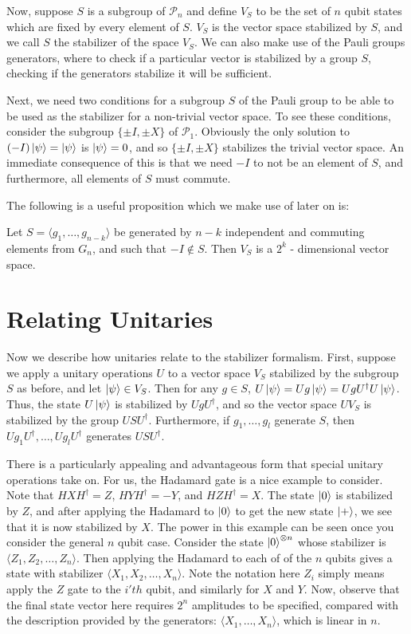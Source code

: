 \documentclass[12pt]{dalthesis}
\begin{document}
Now, suppose $S$ is a subgroup of $\mathcal{P}_n$ and define $V_S$ to be the set of $n$ qubit states which are fixed by every element of $S$. $V_S$ is the vector space stabilized by $S$, and we call $S$ the stabilizer of the space $V_S$. We can also make use of the Pauli groups generators, where to check if a particular vector is stabilized by a group $S$, checking if the generators stabilize it will be sufficient.

Next, we need two conditions for a subgroup $S$ of the Pauli group to be able to be used as the stabilizer for a non-trivial vector space. To see these conditions, consider the subgroup $\{\pm I, \pm X \}$ of $\mathcal{P}_1$. Obviously the only solution to $(-I)\ket{\psi} = \ket{\psi}$ is $\ket{\psi} = 0$, and so $\{\pm I, \pm X \}$ stabilizes the trivial vector space. An immediate consequence of this is that we need $-I$ to not be an element of $S$, and furthermore, all elements of $S$ must commute.

The following is a useful proposition which we make use of later on is:
\begin{proposition}
Let $S = \langle g_1, \dots , g_{n-k} \rangle$ be generated by $n-k$ independent and commuting elements from $G_n$, and such that $-I \not \in S$. Then $V_S$ is a $2^k$ - dimensional vector space.
\end{proposition}


\section{Relating Unitaries}
Now we describe how unitaries relate to the stabilizer formalism. First, suppose we apply a unitary operations $U$ to a vector space $V_S$ stabilized by the subgroup $S$ as before, and let $\ket{\psi} \in V_S$. Then for any $g \in S$, $U\ket{\psi} = Ug\ket{\psi} = UgU^{\dag}U\ket{\psi}$. Thus, the state $U\ket{\psi}$ is stabilized by $UgU^{\dag}$, and so the vector space $UV_S$ is stabilized by the group $USU^{\dag}$. Furthermore, if $g_1, \dots , g_l$ generate $S$, then $Ug_1U^{\dag}, \dots , Ug_lU^{\dag}$ generates $USU^{\dag}$.

There is a particularly appealing and advantageous form that special unitary operations take on. For us, the Hadamard gate is a nice example to consider. Note that $HXH^{\dag} = Z$, $HYH^{\dag} = -Y$, and $HZH^{\dag} = X$. The state $\ket{0}$ is stabilized by $Z$, and after applying the Hadamard to $\ket{0}$ to get the new state $\ket{+}$, we see that it is now stabilized by $X$. The power in this example can be seen once you consider the general $n$ qubit case. Consider the state $\ket{0}^{\otimes n}$ whose stabilizer is $\langle Z_1, Z_2, \dots , Z_n \rangle$. Then applying the Hadamard to each of of the $n$ qubits gives a state with stabilizer $\langle X_1 , X_2, \dots , X_n \rangle $. Note the notation here $Z_i$ simply means apply the $Z$ gate to the $i'th$ qubit, and similarly for $X$ and $Y$. Now, observe that the final state vector here requires $2^n$ amplitudes to be specified, compared with the description provided by the generators: $\langle X_1, \dots , X_n \rangle$, which is linear in $n$. 
\end{document}

